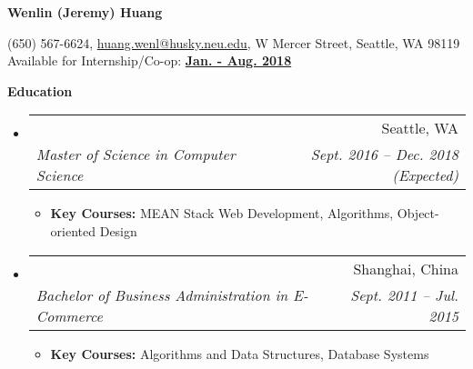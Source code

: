 \documentclass[letterpaper,11pt]{article}
\makeatletter
\newcommand{\resitem}[1]{\item #1 \vspace{-2pt}}
\newcommand{\resheading}[1]{{\large \colorbox{mygrey}{\begin{minipage}{\textwidth}{\textbf{#1 \vphantom{p\^{E}}}}\end{minipage}}}}
\newcommand{\ressubheading}[4]{
\begin{tabular*}{6.5in}{l@{\extracolsep{\fill}}r}
    \textbf{#1} & #2 \\
    \textit{#3} & \textit{#4} \\
\end{tabular*}\vspace{-6pt}}
\makeatother
\begin{document}

    \centering\textbf{\huge Wenlin (Jeremy) Huang}\\ \vspace{0.1in}

    (650) 567-6624,
    \href {mailto:huang.wenl@husky.neu.edu} {huang.wenl@husky.neu.edu},
    {W Mercer Street, Seattle, WA 98119} \\

    {Available for Internship/Co-op: \textbf{\underline{Jan. - Aug. 2018}}}


    \resheading{Education}
    \begin{itemize}
        \item[]
        \ressubheading  %
        {\href
        {http://www.northeastern.edu/seattle/}
        {Northeastern University - Seattle}
        }
        {Seattle, WA}
        {Master of Science in Computer Science}
        {Sept. 2016 -- Dec. 2018 (Expected)}
        {\footnotesize
        \begin{itemize}
            \resitem{
            \textbf{Key Courses:} MEAN Stack Web Development, Algorithms,
            Object-oriented Design
            }
        \end{itemize}
        }

        \item[]
        \ressubheading
        {\href
        {http://www.shnu.edu.cn/}
        {Shanghai Normal University}
        }
        {Shanghai, China}
        {Bachelor of Business Administration in E-Commerce}
        {Sept. 2011 -- Jul. 2015}
        {
        \footnotesize
        \begin{itemize}
            \resitem{
            \textbf{Key Courses:} Algorithms and Data Structures, Database Systems
            }
        \end{itemize}
        }

    \end{itemize}
\end{document}

